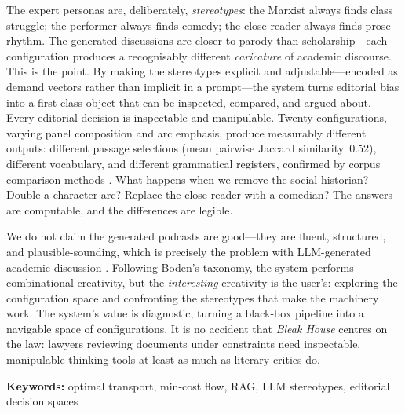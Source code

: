 \documentclass[10pt]{article}
\begin{document}
The expert personas are, deliberately, \emph{stereotypes}: the Marxist
always finds class struggle; the performer always finds comedy; the
close reader always finds prose rhythm. The generated discussions are
closer to parody than scholarship---each configuration produces a
recognisably different \emph{caricature} of academic discourse.  This
is the point.  By making the stereotypes explicit and
adjustable---encoded as demand vectors rather than implicit in a
prompt---the system turns editorial bias into a first-class object
that can be inspected, compared, and argued about.
Every editorial decision is inspectable and manipulable.
Twenty
configurations, varying panel composition and arc emphasis, produce
measurably different outputs: different passage selections (mean
pairwise Jaccard similarity~0.52), different vocabulary, and different
grammatical registers, confirmed by corpus comparison methods
\citep{kilgarriff2001comparing}.  What happens when we remove the
social historian?  Double a character arc?  Replace the close reader
with a comedian?  The answers are computable, and the differences are
legible.

We do not claim the generated podcasts are good---they are fluent,
structured, and plausible-sounding, which is precisely the problem
with LLM-generated academic discussion \citep{doshi2024generative}.
Following Boden's \citeyearpar{boden2004creative} taxonomy, the system
performs combinational creativity, but the \emph{interesting}
creativity is the user's: exploring the configuration space and
confronting the stereotypes that make the machinery work.
The system's value is diagnostic, turning a black-box pipeline into a
navigable space of configurations.
It is no accident that \textit{Bleak House} centres on the law:
lawyers reviewing documents under constraints need inspectable,
manipulable thinking tools at least as much as literary critics do.

\vspace{0.2em}
\noindent\textbf{Keywords:} optimal transport, min-cost flow, RAG, LLM stereotypes, editorial decision spaces

\vspace{-0.3em}


\end{document}
